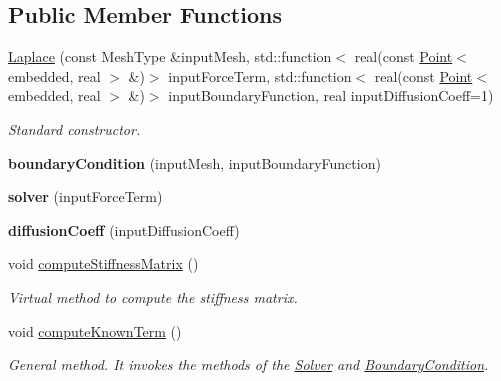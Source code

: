 \subsection*{\-Public \-Member \-Functions}
\begin{DoxyCompactItemize}
\item 
\hyperlink{class_laplace_a12701fdb17859f9348e4cd4d819a95e3}{\-Laplace} (const \-Mesh\-Type \&input\-Mesh, std\-::function$<$ real(const \hyperlink{class_point}{\-Point}$<$ embedded, real $>$ \&)$>$ input\-Force\-Term, std\-::function$<$ real(const \hyperlink{class_point}{\-Point}$<$ embedded, real $>$ \&)$>$ input\-Boundary\-Function, real input\-Diffusion\-Coeff=1)
\begin{DoxyCompactList}\small\item\em \-Standard constructor. \end{DoxyCompactList}\item 
\hypertarget{class_laplace_a6201a934847c0f8092b2c3ca096c6ca6}{{\bfseries boundary\-Condition} (input\-Mesh, input\-Boundary\-Function)}\label{class_laplace_a6201a934847c0f8092b2c3ca096c6ca6}

\item 
\hypertarget{class_laplace_a2efecd636283fc73cc330b994e488113}{{\bfseries solver} (input\-Force\-Term)}\label{class_laplace_a2efecd636283fc73cc330b994e488113}

\item 
\hypertarget{class_laplace_a6a9c5217d0e49022b96c05c488ccecce}{{\bfseries diffusion\-Coeff} (input\-Diffusion\-Coeff)}\label{class_laplace_a6a9c5217d0e49022b96c05c488ccecce}

\item 
\hypertarget{class_laplace_af7da15475d7204175e8f34fbc04091d5}{void \hyperlink{class_laplace_af7da15475d7204175e8f34fbc04091d5}{compute\-Stiffness\-Matrix} ()}\label{class_laplace_af7da15475d7204175e8f34fbc04091d5}

\begin{DoxyCompactList}\small\item\em \-Virtual method to compute the stiffness matrix. \end{DoxyCompactList}\item 
\hypertarget{class_laplace_aa1b02086ed9e87c3aabc1b70a4ad7a82}{void \hyperlink{class_laplace_aa1b02086ed9e87c3aabc1b70a4ad7a82}{compute\-Known\-Term} ()}\label{class_laplace_aa1b02086ed9e87c3aabc1b70a4ad7a82}

\begin{DoxyCompactList}\small\item\em \-General method. \-It invokes the methods of the \hyperlink{class_solver}{\-Solver} and \hyperlink{class_boundary_condition}{\-Boundary\-Condition}. \end{DoxyCompactList}\end{DoxyCompactItemize}
